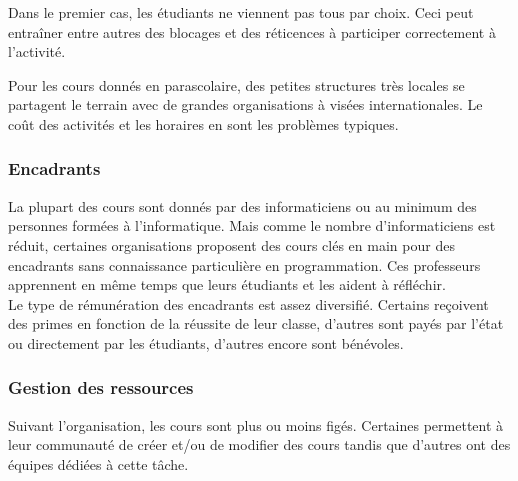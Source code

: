 Dans le premier cas, les étudiants ne viennent pas tous par choix. Ceci peut entraîner entre autres des blocages et des réticences à participer correctement à l'activité.

Pour les cours donnés en parascolaire, des petites structures très locales se partagent le terrain avec de grandes organisations à visées internationales. Le coût des activités et les horaires en sont les problèmes typiques.

\subsubsection{Encadrants} 
La plupart des cours sont donnés par des informaticiens ou au minimum des personnes formées à l'informatique. Mais comme le nombre d'informaticiens est réduit, certaines organisations proposent des cours clés en main pour des encadrants sans connaissance particulière en programmation. Ces professeurs apprennent en même temps que leurs étudiants et les aident à réfléchir.\\

Le type de rémunération des encadrants est assez diversifié. Certains reçoivent des primes en fonction de la réussite de leur classe, d'autres sont payés par l'état ou directement par les étudiants, d'autres encore sont bénévoles.

\subsubsection{Gestion des ressources}
Suivant l'organisation, les cours sont plus ou moins figés. Certaines permettent à leur communauté de créer et/ou de modifier des cours tandis que d'autres ont des équipes dédiées à cette tâche.

